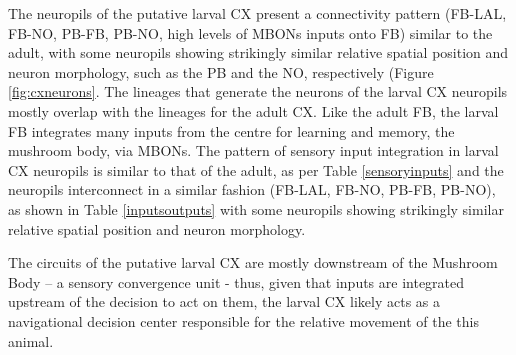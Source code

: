 \documentclass{article}
\begin{document}
The neuropils of the putative larval CX present a connectivity pattern (FB-LAL, FB-NO, PB-FB, PB-NO, high levels of MBONs inputs onto FB) similar to the adult, with some neuropils showing strikingly similar relative spatial position and neuron morphology, such as the PB and the NO, respectively (Figure \ref{fig:cxneurons}. The lineages that generate the neurons of the larval CX neuropils mostly overlap with the lineages for the adult CX. Like the adult FB, the larval FB integrates many inputs from the centre for learning and memory, the mushroom body, via MBONs. The pattern of sensory input integration in larval CX neuropils is similar to that of the adult, as per Table \ref{sensoryinputs} and the neuropils interconnect in a similar fashion (FB-LAL, FB-NO, PB-FB, PB-NO), as shown in Table \ref{inputsoutputs} with some neuropils showing strikingly similar relative spatial position and neuron morphology.


The circuits of the putative larval CX are mostly downstream of the Mushroom Body – a sensory convergence unit - thus, given that  inputs are integrated upstream of  the decision to act on them, the larval CX likely acts as a navigational decision center responsible for the relative movement of the this animal.


\footnotesize 
\end{document}
